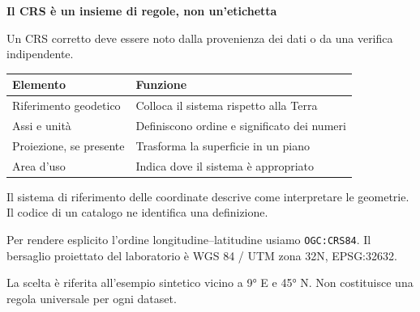 \documentclass[12pt,aspectratio=1610]{beamer}
\newcommand{\PBody}[1]{\par{\fontsize{11.3}{14.8}\selectfont #1\par}}
\newcommand{\PSmall}[1]{\par{\fontsize{9.8}{13.1}\selectfont #1\par}}
\newcommand{\PInfo}[1]{%
\begin{tcolorbox}[enhanced,arc=1.6mm,boxrule=.55pt,colback=GeoTint,
 colframe=Rule!80!Classical,left=2.3mm,right=2.3mm,top=2mm,bottom=2mm,
 before skip=1mm,after skip=1mm]
\PSmall{#1}\end{tcolorbox}}
\begin{document}
\begin{frame}[plain]\hypertarget{slide25}{}
\begin{lrbox}{\TitleBox}
\begin{minipage}[t]{17.7cm}\raggedright\color{Ink}\fontsize{11.3}{14.8}\selectfont
\color{Navy}\bfseries\fontsize{20.6}{24.5}\selectfont Il CRS è un insieme di regole, non un’etichetta
\end{minipage}\end{lrbox}

\begin{lrbox}{\RecallBox}
\begin{minipage}[t]{14.3cm}\raggedright\color{Ink}\fontsize{11.3}{14.8}\selectfont
\fontsize{10.3}{13.8}\selectfont Un CRS corretto deve essere noto dalla provenienza dei dati o da una verifica indipendente.
\end{minipage}\end{lrbox}

\begin{lrbox}{\PilotLeftBox}
\begin{minipage}[t]{10.05cm}\raggedright\color{Ink}\fontsize{11.3}{14.8}\selectfont
{\fontsize{10.2}{13.1}\selectfont\renewcommand{\arraystretch}{1.45}\begin{tabular}{@{}p{3.3cm}p{5.7cm}@{}}\toprule
\textbf{Elemento} & \textbf{Funzione}\\\midrule
Riferimento geodetico & Colloca il sistema rispetto alla Terra\\
Assi e unità & Definiscono ordine e significato dei numeri\\
Proiezione, se presente & Trasforma la superficie in un piano\\
Area d’uso & Indica dove il sistema è appropriato\\
\bottomrule\end{tabular}}

\end{minipage}\end{lrbox}

\begin{lrbox}{\PilotRightBox}
\begin{minipage}[t]{7.55cm}\raggedright\color{Ink}\fontsize{11.3}{14.8}\selectfont
\PBody{Il sistema di riferimento delle coordinate descrive come interpretare le geometrie. Il codice di un catalogo ne identifica una definizione.}
\vspace{2.5mm}
\PInfo{Per rendere esplicito l’ordine longitudine--latitudine usiamo \texttt{OGC:CRS84}. Il bersaglio proiettato del laboratorio è WGS 84 / UTM zona 32N, EPSG:32632.}
\PBody{La scelta è riferita all’esempio sintetico vicino a 9° E e 45° N. Non costituisce una regola universale per ogni dataset.}
\vspace{2.5mm}


\end{minipage}
\end{lrbox}
\end{frame}
\end{document}
